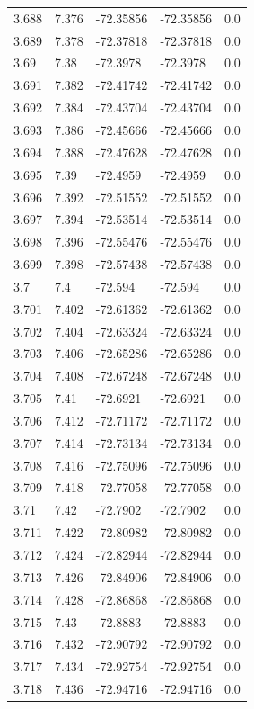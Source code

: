 \begin{tabular}{lllll}
3.688 & 7.376 & -72.35856 & -72.35856 & 0.0 \\
3.689 & 7.378 & -72.37818 & -72.37818 & 0.0 \\
3.69 & 7.38 & -72.3978 & -72.3978 & 0.0 \\
3.691 & 7.382 & -72.41742 & -72.41742 & 0.0 \\
3.692 & 7.384 & -72.43704 & -72.43704 & 0.0 \\
3.693 & 7.386 & -72.45666 & -72.45666 & 0.0 \\
3.694 & 7.388 & -72.47628 & -72.47628 & 0.0 \\
3.695 & 7.39 & -72.4959 & -72.4959 & 0.0 \\
3.696 & 7.392 & -72.51552 & -72.51552 & 0.0 \\
3.697 & 7.394 & -72.53514 & -72.53514 & 0.0 \\
3.698 & 7.396 & -72.55476 & -72.55476 & 0.0 \\
3.699 & 7.398 & -72.57438 & -72.57438 & 0.0 \\
3.7 & 7.4 & -72.594 & -72.594 & 0.0 \\
3.701 & 7.402 & -72.61362 & -72.61362 & 0.0 \\
3.702 & 7.404 & -72.63324 & -72.63324 & 0.0 \\
3.703 & 7.406 & -72.65286 & -72.65286 & 0.0 \\
3.704 & 7.408 & -72.67248 & -72.67248 & 0.0 \\
3.705 & 7.41 & -72.6921 & -72.6921 & 0.0 \\
3.706 & 7.412 & -72.71172 & -72.71172 & 0.0 \\
3.707 & 7.414 & -72.73134 & -72.73134 & 0.0 \\
3.708 & 7.416 & -72.75096 & -72.75096 & 0.0 \\
3.709 & 7.418 & -72.77058 & -72.77058 & 0.0 \\
3.71 & 7.42 & -72.7902 & -72.7902 & 0.0 \\
3.711 & 7.422 & -72.80982 & -72.80982 & 0.0 \\
3.712 & 7.424 & -72.82944 & -72.82944 & 0.0 \\
3.713 & 7.426 & -72.84906 & -72.84906 & 0.0 \\
3.714 & 7.428 & -72.86868 & -72.86868 & 0.0 \\
3.715 & 7.43 & -72.8883 & -72.8883 & 0.0 \\
3.716 & 7.432 & -72.90792 & -72.90792 & 0.0 \\
3.717 & 7.434 & -72.92754 & -72.92754 & 0.0 \\
3.718 & 7.436 & -72.94716 & -72.94716 & 0.0 \\

\end{tabular}

